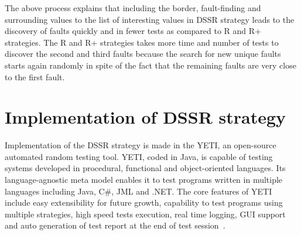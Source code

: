 \documentclass[conference]{IEEEtran}
\begin{document}
The above process explains that including the border, fault-finding and surrounding values to the list of interesting values in DSSR strategy leads to the discovery of faults quickly and in fewer tests as compared to R and R+ strategies. The R and R+ strategies takes more time and number of tests to discover the second and third faults because the search for new unique faults starts again randomly in spite of the fact that the remaining faults are very close to the first fault.




\section{Implementation of DSSR strategy}\label{sec:imp}
Implementation of the DSSR strategy is made in the YETI, an open-source automated random testing tool. YETI, coded in Java, is capable of testing systems developed in procedural, functional and object-oriented languages. Its language-agnostic meta model enables it to test programs written in multiple languages including Java, C\#, JML and .NET. The core features of YETI include easy extensibility for future growth, capability to test programs using multiple strategies, high speed tests execution, real time logging, GUI support and auto generation of test report at the end of test session~\cite{Oriol2012, Oriol2011}.



\end{document}
